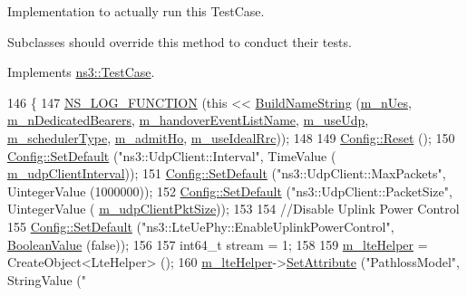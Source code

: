 Implementation to actually run this Test\+Case. 

Subclasses should override this method to conduct their tests. 

Implements \hyperlink{classns3_1_1TestCase_a8ff74680cf017ed42011e4be51917a24}{ns3\+::\+Test\+Case}.


\begin{DoxyCode}
146 \{
147   \hyperlink{log-macros-disabled_8h_a90b90d5bad1f39cb1b64923ea94c0761}{NS\_LOG\_FUNCTION} (\textcolor{keyword}{this} << \hyperlink{classLteX2HandoverTestCase_ab828d5e2bea55d05dc55db0a85e93ab1}{BuildNameString} (\hyperlink{classLteX2HandoverTestCase_a31a9b7786b2204ed8cc910fe0aae6307}{m\_nUes}, 
      \hyperlink{classLteX2HandoverTestCase_af2146e1a8c7985f642c7fb69ad7ec345}{m\_nDedicatedBearers}, \hyperlink{classLteX2HandoverTestCase_a3473a824d293d99f2da2f3aa30800aca}{m\_handoverEventListName}, 
      \hyperlink{classLteX2HandoverTestCase_a70c8ee7faf2c84d6bad133cca4665fb4}{m\_useUdp}, \hyperlink{classLteX2HandoverTestCase_a37c1896a069311a7bcd63b536aedef81}{m\_schedulerType}, \hyperlink{classLteX2HandoverTestCase_ab4ea238434f2750bde6a599448968c81}{m\_admitHo}, 
      \hyperlink{classLteX2HandoverTestCase_a3a6c8e1e087766873c9ff712fdedc9d4}{m\_useIdealRrc}));
148 
149   \hyperlink{group__config_ga2c1b65724f42f8c72276d7e7ad6df6db}{Config::Reset} ();
150   \hyperlink{group__config_ga2e7882df849d8ba4aaad31c934c40c06}{Config::SetDefault} (\textcolor{stringliteral}{"ns3::UdpClient::Interval"},  TimeValue (
      \hyperlink{classLteX2HandoverTestCase_af7c37f7d9c2ee0ca117956c998548538}{m\_udpClientInterval}));
151   \hyperlink{group__config_ga2e7882df849d8ba4aaad31c934c40c06}{Config::SetDefault} (\textcolor{stringliteral}{"ns3::UdpClient::MaxPackets"}, UintegerValue (1000000));  
152   \hyperlink{group__config_ga2e7882df849d8ba4aaad31c934c40c06}{Config::SetDefault} (\textcolor{stringliteral}{"ns3::UdpClient::PacketSize"}, UintegerValue (
      \hyperlink{classLteX2HandoverTestCase_a395f2887d4796000ee5ec156bd59ee3d}{m\_udpClientPktSize}));  
153 
154   \textcolor{comment}{//Disable Uplink Power Control}
155   \hyperlink{group__config_ga2e7882df849d8ba4aaad31c934c40c06}{Config::SetDefault} (\textcolor{stringliteral}{"ns3::LteUePhy::EnableUplinkPowerControl"}, 
      \hyperlink{classns3_1_1BooleanValue}{BooleanValue} (\textcolor{keyword}{false}));
156 
157   int64\_t stream = 1;
158   
159   \hyperlink{classLteX2HandoverTestCase_afa4987b8bd9d1c3062f7705ef808be18}{m\_lteHelper} = CreateObject<LteHelper> ();
160   \hyperlink{classLteX2HandoverTestCase_afa4987b8bd9d1c3062f7705ef808be18}{m\_lteHelper}->\hyperlink{classns3_1_1ObjectBase_ac60245d3ea4123bbc9b1d391f1f6592f}{SetAttribute} (\textcolor{stringliteral}{"PathlossModel"}, StringValue (\textcolor{stringliteral}{"
}
\end{DoxyCode}
